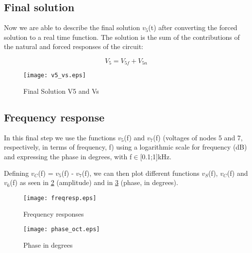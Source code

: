 
\subsection{Final solution}

Now we are able to describe the final solution $v_5$(t) after converting the forced solution to a real time function. The solution is the sum of the contributions of the natural and forced responses of the circuit:  

\begin{equation}
  V_5 = V_{5f} + V_{5n}
  \label{eq:kvl20}
\end{equation}

\begin{figure}[h] \centering
\texttt{[image: v5\_vs.eps]}
\caption{Final Solution V5 and Vs}
\label{fig:v5_vs}
\end{figure}
\FloatBarrier

\subsection{Frequency response}

In this final step we use the functions $v_5$(f) and $v_7$(f) (voltages of nodes 5 and 7, respectively, in terms of frequency, f) using a logarithmic scale for frequency (dB) and expressing the phase in degrees, with f$\in$[0.1;1]kHz. \par
Defining $v_C$(f) = $v_5$(f) - $v_7$(f), we can then plot different functions $v_S$(f), $v_C$(f) and $v_6$(f) as seen in \ref{fig:freqresp} (amplitude) and in \ref{fig:phase_oct} (phase, in degrees). %

\begin{figure}[h] \centering
\texttt{[image: freqresp.eps]}
\caption{Frequency responses}
\label{fig:freqresp}
\end{figure}
\FloatBarrier

\begin{figure}[h] \centering
\texttt{[image: phase\_oct.eps]}
\caption{Phase in degrees}
\label{fig:phase_oct}
\end{figure}
\FloatBarrier

















